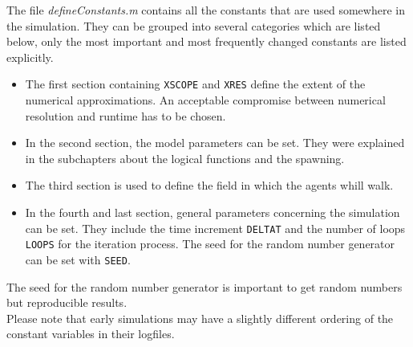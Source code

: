 
\noi The file \textit{defineConstants.m} contains all the constants that are used somewhere in the simulation. They can be grouped into several categories which are listed below, only the most important and most frequently changed constants are listed explicitly.\\
\begin{itemize}
	\item The first section containing \texttt{XSCOPE} and \texttt{XRES} define the extent of the numerical approximations. An acceptable compromise between numerical resolution and runtime has to be chosen.
	\item In the second section, the model parameters can be set. They were explained in the subchapters about the logical functions and the spawning.
	\item The third section is used to define the field in which the agents whill walk.
	\item In the fourth and last section, general parameters concerning the simulation can be set. They include the time increment \texttt{DELTAT} and the number of loops \texttt{LOOPS} for the iteration process. The seed for the random number generator can be set with \texttt{SEED}.
\end{itemize}
\noi The seed for the random number generator is important to get random numbers but reproducible results.\\
Please note that early simulations may have a slightly different ordering of the constant variables in their logfiles.